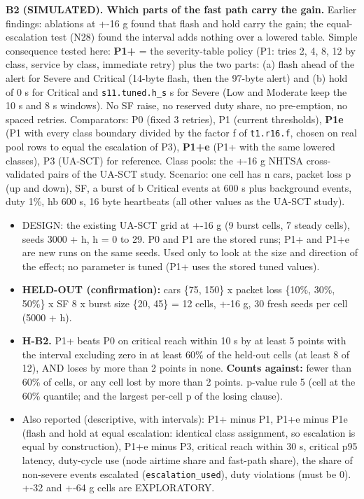 \textbf{B2 (SIMULATED). Which parts of the fast path carry the gain.} Earlier findings: ablations at +-16 g found that flash and hold carry the gain; the equal-escalation test (N28) found the interval adds nothing over a lowered table. Simple consequence tested here: \textbf{P1+} = the severity-table policy (P1: tries 2, 4, 8, 12 by class, service by class, immediate retry) plus the two parts: (a) flash ahead of the alert for Severe and Critical (14-byte flash, then the 97-byte alert) and (b) hold of 0 s for Critical and \texttt{s11.tuned.h\_s} s for Severe (Low and Moderate keep the 10 s and 8 s windows). No SF raise, no reserved duty share, no pre-emption, no spaced retries. Comparators: P0 (fixed 3 retries), P1 (current thresholds), \textbf{P1e} (P1 with every class boundary divided by the factor f of \texttt{t1.r16.f}, chosen on real pool rows to equal the escalation of P3), \textbf{P1+e} (P1+ with the same lowered classes), P3 (UA-SCT) for reference. Class pools: the +-16 g NHTSA cross-validated pairs of the UA-SCT study. Scenario: one cell has n cars, packet loss p (up and down), SF, a burst of b Critical events at 600 s plus background events, duty 1\%, hb 600 s, 16 byte heartbeats (all other values as the UA-SCT study).
\begin{itemize}
\item DESIGN: the existing UA-SCT grid at +-16 g (9 burst cells, 7 steady cells), seeds 3000 + h, h = 0 to 29. P0 and P1 are the stored runs; P1+ and P1+e are new runs on the same seeds. Used only to look at the size and direction of the effect; no parameter is tuned (P1+ uses the stored tuned values).
\item \textbf{HELD-OUT (confirmation):} cars \{75, 150\} x packet loss \{10\%, 30\%, 50\%\} x SF 8 x burst size \{20, 45\} = 12 cells, +-16 g, 30 fresh seeds per cell (5000 + h).
\item \textbf{H-B2.} P1+ beats P0 on critical reach within 10 s by at least 5 points with the interval excluding zero in at least 60\% of the held-out cells (at least 8 of 12), AND loses by more than 2 points in none. \textbf{Counts against:} fewer than 60\% of cells, or any cell lost by more than 2 points. p-value rule 5 (cell at the 60\% quantile; and the largest per-cell p of the losing clause).
\item Also reported (descriptive, with intervals): P1+ minus P1, P1+e minus P1e (flash and hold at equal escalation: identical class assignment, so escalation is equal by construction), P1+e minus P3, critical reach within 30 s, critical p95 latency, duty-cycle use (node airtime share and fast-path share), the share of non-severe events escalated (\texttt{escalation\_used}), duty violations (must be 0). +-32 and +-64 g cells are EXPLORATORY.
\end{itemize}

